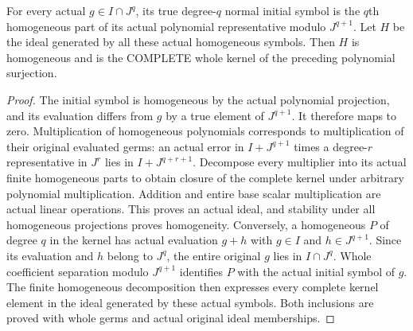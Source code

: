\begin{theorem}
\label{hir:relative-normal-graded-whole-initial-ideal}
\leanok
{}
For every actual $g\in I\cap J^q$, its true degree-$q$ normal initial
symbol is the $q$th homogeneous part of its actual polynomial
representative modulo $J^{q+1}$. Let $H$ be the ideal generated by all
these actual homogeneous symbols. Then $H$ is homogeneous and is the
COMPLETE whole kernel of the preceding polynomial surjection.
\end{theorem}
\begin{proof}
The initial symbol is homogeneous by the actual polynomial projection,
and its evaluation differs from $g$ by a true element of $J^{q+1}$.
It therefore maps to zero. Multiplication of homogeneous polynomials
corresponds to multiplication of their original evaluated germs: an
actual error in $I+J^{q+1}$ times a degree-$r$ representative in $J^r$
lies in $I+J^{q+r+1}$. Decompose every multiplier into its actual finite
homogeneous parts to obtain closure of the complete kernel under arbitrary
polynomial multiplication. Addition and entire base scalar multiplication
are actual linear operations. This proves an actual ideal, and stability
under all homogeneous projections proves homogeneity. Conversely, a
homogeneous $P$ of degree $q$ in the kernel has actual evaluation
$g+h$ with $g\in I$ and $h\in J^{q+1}$. Since its evaluation and $h$
belong to $J^q$, the entire original $g$ lies in $I\cap J^q$. Whole
coefficient separation modulo $J^{q+1}$ identifies $P$ with the actual
initial symbol of $g$. The finite homogeneous decomposition then expresses
every complete kernel element in the ideal generated by these actual
symbols. Both inclusions are proved with whole germs and actual original
ideal memberships.
\end{proof}


